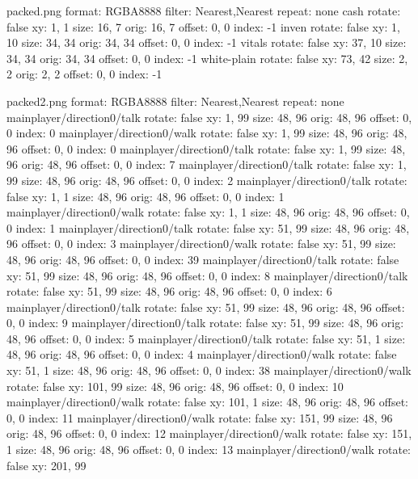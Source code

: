 
packed.png
format: RGBA8888
filter: Nearest,Nearest
repeat: none
cash
  rotate: false
  xy: 1, 1
  size: 16, 7
  orig: 16, 7
  offset: 0, 0
  index: -1
inven
  rotate: false
  xy: 1, 10
  size: 34, 34
  orig: 34, 34
  offset: 0, 0
  index: -1
vitals
  rotate: false
  xy: 37, 10
  size: 34, 34
  orig: 34, 34
  offset: 0, 0
  index: -1
white-plain
  rotate: false
  xy: 73, 42
  size: 2, 2
  orig: 2, 2
  offset: 0, 0
  index: -1

packed2.png
format: RGBA8888
filter: Nearest,Nearest
repeat: none
mainplayer/direction0/talk
  rotate: false
  xy: 1, 99
  size: 48, 96
  orig: 48, 96
  offset: 0, 0
  index: 0
mainplayer/direction0/walk
  rotate: false
  xy: 1, 99
  size: 48, 96
  orig: 48, 96
  offset: 0, 0
  index: 0
mainplayer/direction0/talk
  rotate: false
  xy: 1, 99
  size: 48, 96
  orig: 48, 96
  offset: 0, 0
  index: 7
mainplayer/direction0/talk
  rotate: false
  xy: 1, 99
  size: 48, 96
  orig: 48, 96
  offset: 0, 0
  index: 2
mainplayer/direction0/talk
  rotate: false
  xy: 1, 1
  size: 48, 96
  orig: 48, 96
  offset: 0, 0
  index: 1
mainplayer/direction0/walk
  rotate: false
  xy: 1, 1
  size: 48, 96
  orig: 48, 96
  offset: 0, 0
  index: 1
mainplayer/direction0/talk
  rotate: false
  xy: 51, 99
  size: 48, 96
  orig: 48, 96
  offset: 0, 0
  index: 3
mainplayer/direction0/walk
  rotate: false
  xy: 51, 99
  size: 48, 96
  orig: 48, 96
  offset: 0, 0
  index: 39
mainplayer/direction0/talk
  rotate: false
  xy: 51, 99
  size: 48, 96
  orig: 48, 96
  offset: 0, 0
  index: 8
mainplayer/direction0/talk
  rotate: false
  xy: 51, 99
  size: 48, 96
  orig: 48, 96
  offset: 0, 0
  index: 6
mainplayer/direction0/talk
  rotate: false
  xy: 51, 99
  size: 48, 96
  orig: 48, 96
  offset: 0, 0
  index: 9
mainplayer/direction0/talk
  rotate: false
  xy: 51, 99
  size: 48, 96
  orig: 48, 96
  offset: 0, 0
  index: 5
mainplayer/direction0/talk
  rotate: false
  xy: 51, 1
  size: 48, 96
  orig: 48, 96
  offset: 0, 0
  index: 4
mainplayer/direction0/walk
  rotate: false
  xy: 51, 1
  size: 48, 96
  orig: 48, 96
  offset: 0, 0
  index: 38
mainplayer/direction0/walk
  rotate: false
  xy: 101, 99
  size: 48, 96
  orig: 48, 96
  offset: 0, 0
  index: 10
mainplayer/direction0/walk
  rotate: false
  xy: 101, 1
  size: 48, 96
  orig: 48, 96
  offset: 0, 0
  index: 11
mainplayer/direction0/walk
  rotate: false
  xy: 151, 99
  size: 48, 96
  orig: 48, 96
  offset: 0, 0
  index: 12
mainplayer/direction0/walk
  rotate: false
  xy: 151, 1
  size: 48, 96
  orig: 48, 96
  offset: 0, 0
  index: 13
mainplayer/direction0/walk
  rotate: false
  xy: 201, 99
